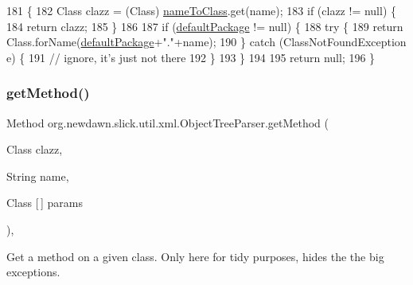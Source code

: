 \begin{DoxyCode}
181                                                       \{
182         Class clazz = (Class) \mbox{\hyperlink{classorg_1_1newdawn_1_1slick_1_1util_1_1xml_1_1_object_tree_parser_ac81f61688951ebf234982da046b22dd9}{nameToClass}}.get(name);
183         \textcolor{keywordflow}{if} (clazz != null) \{
184             \textcolor{keywordflow}{return} clazz;
185         \}
186         
187         \textcolor{keywordflow}{if} (\mbox{\hyperlink{classorg_1_1newdawn_1_1slick_1_1util_1_1xml_1_1_object_tree_parser_ab71da775b688ffcb01dd17456a4013bb}{defaultPackage}} != null) \{
188             \textcolor{keywordflow}{try} \{
189                 \textcolor{keywordflow}{return} Class.forName(\mbox{\hyperlink{classorg_1_1newdawn_1_1slick_1_1util_1_1xml_1_1_object_tree_parser_ab71da775b688ffcb01dd17456a4013bb}{defaultPackage}}+\textcolor{stringliteral}{"."}+name);
190             \} \textcolor{keywordflow}{catch} (ClassNotFoundException e) \{
191                 \textcolor{comment}{// ignore, it's just not there}
192             \}
193         \}
194         
195         \textcolor{keywordflow}{return} null;
196     \}
\end{DoxyCode}
\mbox{\label{classorg_1_1newdawn_1_1slick_1_1util_1_1xml_1_1_object_tree_parser_a6d75c7a61198e54be45a307a9815c583}} 
\subsubsection{\texorpdfstring{get\+Method()}{getMethod()}}
{\footnotesize\ttfamily Method org.\+newdawn.\+slick.\+util.\+xml.\+Object\+Tree\+Parser.\+get\+Method (\begin{DoxyParamCaption}\item[{Class}]{clazz,  }\item[{String}]{name,  }\item[{Class \mbox{[}$\,$\mbox{]}}]{params }\end{DoxyParamCaption})\hspace{0.3cm}{\ttfamily [inline]}, {\ttfamily [private]}}

Get a method on a given class. Only here for tidy purposes, hides the the big exceptions.


